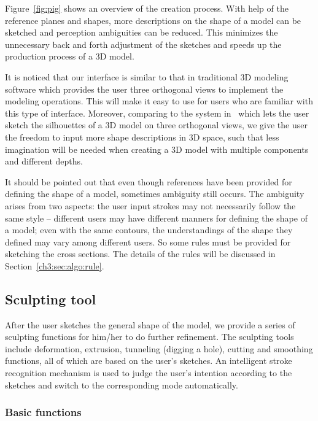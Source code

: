 Figure~\ref{fig:pig} shows an overview of the creation process. With
 help of the reference planes and shapes, more descriptions on the
shape of a model can be sketched and perception ambiguities can be
reduced. This minimizes the unnecessary back and forth adjustment of
the sketches and speeds up the production process of a 3D model.

It is noticed that our interface is similar to that in traditional
3D modeling software which provides the user three orthogonal views
to implement the modeling operations. This will make it easy to use
for users who are familiar with this type of interface. Moreover,
comparing to the system in~\cite{RDI10} which lets the user  sketch
the silhouettes of a 3D model on three orthogonal views, we give the
user the freedom to input more shape descriptions in 3D space, such
that less imagination will be needed when creating a 3D model with
multiple components and different depths.

It should be pointed out that even though references have been
provided for defining the shape of a model, sometimes ambiguity
still occurs. The ambiguity arises from two aspects: the user input
strokes may not necessarily follow the same style -- different users
may have different manners for defining the shape of a model; even
with the same contours, the understandings of the shape they defined
may vary among different users. So some rules must be provided for
sketching the cross sections. The details of the rules will be
discussed in Section~\ref{ch3:sec:algo:rule}.

\subsection{Sculpting tool}
\label{ch3:sec:ui:sculpt}

After the user sketches the general shape of the  model, we provide
a series of sculpting functions for him/her to do further
refinement. The sculpting tools include deformation, extrusion,
tunneling (digging a hole), cutting and smoothing functions, all of
which are based on the user's sketches. An intelligent stroke
recognition mechanism is used to judge the user's intention
according to the sketches and switch to the corresponding mode
automatically.

\subsubsection{Basic functions}
\label{Sec:UI:sculpt:mode}

